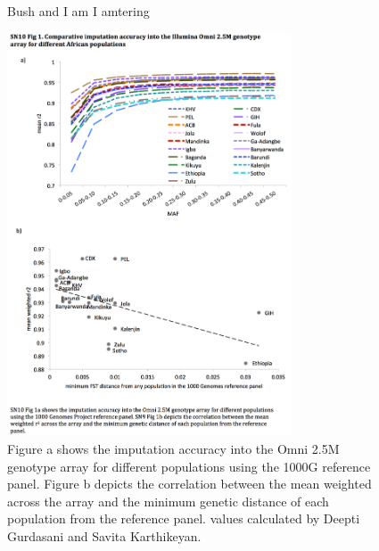 \begin{figure}

\cenw Bush and I am I amtering

\includegraphics[trim={0 3cm 0 1.5cm},clip,width=0.75\textwidth]{fig/SN10f1}

\caption[Imputation accuracy for different populations as a function of \gls{MAF} and .]{Figure a shows the imputation accuracy into the Omni 2.5M genotype array for different populations using the \gls{1000G} reference panel. Figure b depicts the correlation between the mean weighted  across the array and the minimum genetic distance of each population from the reference panel.  values calculated by Deepti Gurdasani and Savita Karthikeyan.}

\label{fig:SN10f1}

\end{figure}